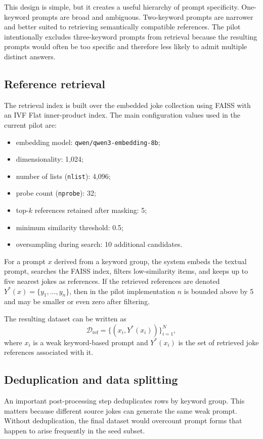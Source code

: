 \documentclass[14pt,a4paper]{extreport}
\begin{document}
This design is simple, but it creates a useful hierarchy of prompt specificity. One-keyword prompts are broad and ambiguous. Two-keyword prompts are narrower and better suited to retrieving semantically compatible references. The pilot intentionally excludes three-keyword prompts from retrieval because the resulting prompts would often be too specific and therefore less likely to admit multiple distinct answers.

\subsection{Reference retrieval}

The retrieval index is built over the embedded joke collection using FAISS with an IVF Flat inner-product index. The main configuration values used in the current pilot are:
\begin{itemize}
  \item embedding model: \texttt{qwen/qwen3-embedding-8b};
  \item dimensionality: 1{,}024;
  \item number of lists (\texttt{nlist}): 4{,}096;
  \item probe count (\texttt{nprobe}): 32;
  \item top-\(k\) references retained after masking: 5;
  \item minimum similarity threshold: 0.5;
  \item oversampling during search: 10 additional candidates.
\end{itemize}

For a prompt \(x\) derived from a keyword group, the system embeds the textual prompt, searches the FAISS index, filters low-similarity items, and keeps up to five nearest jokes as references. If the retrieved references are denoted \(Y^{*}(x)=\{y_1,\dots,y_n\}\), then in the pilot implementation \(n\) is bounded above by 5 and may be smaller or even zero after filtering.

The resulting dataset can be written as
\[
  \mathcal{D}_{\text{ref}}=\{(x_i, Y^{*}(x_i))\}_{i=1}^{N},
\]
where \(x_i\) is a weak keyword-based prompt and \(Y^{*}(x_i)\) is the set of retrieved joke references associated with it.

\subsection{Deduplication and data splitting}

An important post-processing step deduplicates rows by keyword group. This matters because different source jokes can generate the same weak prompt. Without deduplication, the final dataset would overcount prompt forms that happen to arise frequently in the seed subset.
\end{document}

